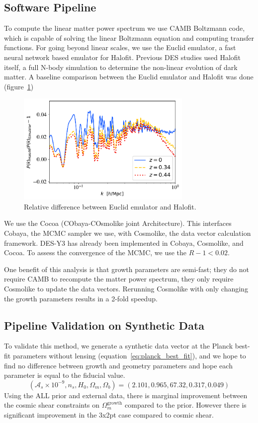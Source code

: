 \subsection{Software Pipeline}
To compute the linear matter power spectrum we use \textsc{CAMB} Boltzmann code, which is capable of solving the linear Boltzmann equation and computing transfer functions. For going beyond linear scales, we use the Euclid emulator, a fast neural network based emulator for Halofit. Previous DES studies used Halofit itself, a full N-body simulation to determine the non-linear evolution of dark matter. A baseline comparison between the Euclid emulator and Halofit was done (figure~\ref{fig:euc_v_halo})
\begin{figure}[ht]
	\centering
	\includegraphics[width=0.75\textwidth]{plots/halo_vs_emu.pdf}
	\caption{Relative difference between Euclid emulator and Halofit.}
	\label{fig:euc_v_halo}
\end{figure}
We use the Cocoa (CObaya-COsmolike joint Architecture). This interfaces Cobaya, the MCMC sampler we use, with Cosmolike, the data vector calculation framework. DES-Y3 has already been implemented in Cobaya, Cosmolike, and Cocoa. To assess the convergence of the MCMC, we use the $R-1<0.02$.

One benefit of this analysis is that growth parameters are semi-fast; they do not require CAMB to recompute the matter power spectrum, they only require Cosmolike to update the data vectors. Rerunning Cosmolike with only changing the growth parameters results in a 2-fold speedup.
\subsection{Pipeline Validation on Synthetic Data}
To validate this method, we generate a synthetic data vector at the Planck best-fit parameters without lensing (equation~\ref{eq:planck_best_fit}), and we hope to find no difference between growth and geometry parameters and hope each parameter is equal to the fiducial value.
\begin{equation}\label{eq:planck_best_fit}
	(\mathcal{A}_s\times10^{-9}, n_s, H_0, \Omega_m, \Omega_b) = (2.101,0.965,67.32,0.317,0.049)
\end{equation}
Using the ALL prior and external data, there is marginal improvement between the cosmic shear constraints on $\Omega_m^\mathrm{growth}$ compared to the prior. However there is significant improvement in the 3x2pt case compared to cosmic shear. 

